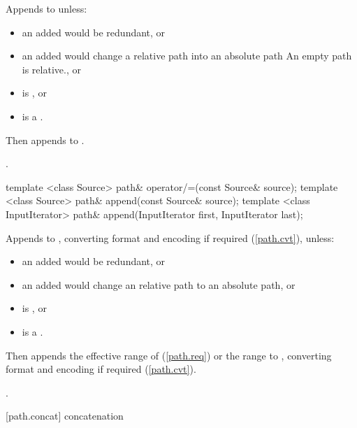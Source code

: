 \begin{itemdescr}
\pnum
\effects Appends  to  unless:
\begin{itemize}
\item an added 
    would be redundant, or
\item an added  would change a relative path into an absolute path
    \enternote An empty path is relative.\exitnote, or
\item {} is , or
\item {} is a .
\end{itemize}
Then appends  to .

\pnum
\returns {}.
\end{itemdescr}

\begin{itemdecl}
template <class Source>
  path& operator/=(const Source& source);
template <class Source>
  path& append(const Source& source);
template <class InputIterator>
  path& append(InputIterator first, InputIterator last);
\end{itemdecl}

\begin{itemdescr}
\pnum
\effects Appends  to ,
    converting format and encoding if required (\ref{path.cvt}), unless:
\begin{itemize}
\item an added  would be redundant, or
\item an added  would change an relative path to an absolute path, or
\item {} is , or
\item {} is a .
\end{itemize}
Then appends the effective range of  (\ref{path.req})
    or the range  to ,
    converting format and encoding if required (\ref{path.cvt}).

\pnum
\returns {}.
\end{itemdescr}

[path.concat]{ concatenation}

